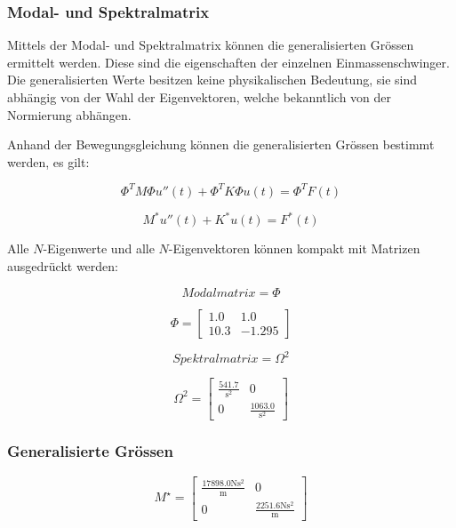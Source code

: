 \documentclass[
  letterpaper,
  DIV=11]{scrreprt}
\begin{document}
\hypertarget{modal--und-spektralmatrix}{%
\subsubsection{Modal- und
Spektralmatrix}\label{modal--und-spektralmatrix}}

Mittels der Modal- und Spektralmatrix können die generalisierten Grössen
ermittelt werden. Diese sind die eigenschaften der einzelnen
Einmassenschwinger. Die generalisierten Werte besitzen keine
physikalischen Bedeutung, sie sind abhängig von der Wahl der
Eigenvektoren, welche bekanntlich von der Normierung abhängen.

Anhand der Bewegungsgleichung können die generalisierten Grössen
bestimmt werden, es gilt:

\[\Phi^T M \Phi u''(t) + \Phi^T K \Phi u(t) = \Phi^T F(t)\]

\[M^*u''(t) + K^* u(t) = F^* (t)\]

Alle \(N\)-Eigenwerte und alle \(N\)-Eigenvektoren können kompakt mit
Matrizen ausgedrückt werden:

\begin{equation}Modalmatrix = \Phi\end{equation}

\begin{equation}\Phi = \left[\begin{matrix}1.0 & 1.0\\10.3 & -1.295\end{matrix}\right]\end{equation}

\begin{equation}Spektralmatrix = \Omega^{2}\end{equation}

\begin{equation}\Omega^{2} = \left[\begin{matrix}\frac{541.7}{\text{s}^{2}} & 0\\0 & \frac{1063.0}{\text{s}^{2}}\end{matrix}\right]\end{equation}

\hypertarget{generalisierte-gruxf6ssen}{%
\subsubsection{Generalisierte Grössen}\label{generalisierte-gruxf6ssen}}

\begin{equation}M^{\star} = \left[\begin{matrix}\frac{17898.0 \text{N} \text{s}^{2}}{\text{m}} & 0\\0 & \frac{2251.6 \text{N} \text{s}^{2}}{\text{m}}\end{matrix}\right]\end{equation}
\end{document}
